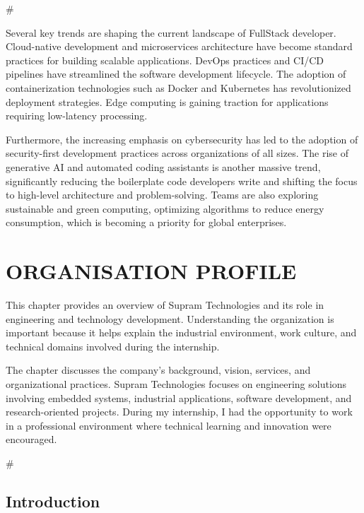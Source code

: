 \documentclass[12pt,a4paper]{report}
\begin{document}
\#


Several key trends are shaping the current landscape of FullStack developer. Cloud-native development and microservices architecture have become standard practices for building scalable applications. DevOps practices and CI/CD pipelines have streamlined the software development lifecycle. The adoption of containerization technologies such as Docker and Kubernetes has revolutionized deployment strategies. Edge computing is gaining traction for applications requiring low-latency processing.


Furthermore, the increasing emphasis on cybersecurity has led to the adoption of security-first development practices across organizations of all sizes. The rise of generative AI and automated coding assistants is another massive trend, significantly reducing the boilerplate code developers write and shifting the focus to high-level architecture and problem-solving. Teams are also exploring sustainable and green computing, optimizing algorithms to reduce energy consumption, which is becoming a priority for global enterprises.




\chapter{ORGANISATION PROFILE}
\label{ch:org}


This chapter provides an overview of Supram Technologies and its role in engineering and technology development. Understanding the organization is important because it helps explain the industrial environment, work culture, and technical domains involved during the internship.


The chapter discusses the company’s background, vision, services, and organizational practices. Supram Technologies focuses on engineering solutions involving embedded systems, industrial applications, software development, and research-oriented projects. During my internship, I had the opportunity to work in a professional environment where technical learning and innovation were encouraged.


\#


\section{Introduction}
\end{document}
